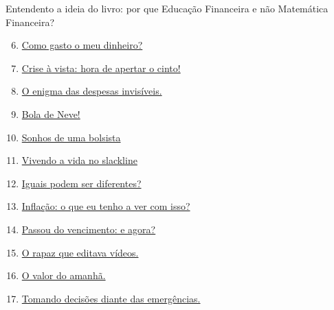 \begin{apresentacao}{Entendento a ideia do livro: por que Educação Financeira e não Matemática Financeira?}
\begin{multicols}{2}
\begin{enumerate}[label=Atividade \arabic* --, wide]\setcounter{enumi}{5}
\item \hyperref[fin-ativ-6]{Como gasto o meu dinheiro?}
\item \hyperref[fin-ativ-7]{Crise à vista: hora de apertar o cinto!}
\end{enumerate}

\begin{enumerate}[label=Atividade \arabic* --, wide]\setcounter{enumi}{7}
\item \hyperref[fin-ativ-8]{O enigma das despesas invisíveis.}
\item \hyperref[fin-ativ-9]{Bola de Neve!}
\end{enumerate}

\begin{enumerate}[label=Atividade \arabic* --, wide]\setcounter{enumi}{9}
\item \hyperref[fin-ativ-10]{Sonhos de uma bolsista}
\item \hyperref[fin-ativ-11]{Vivendo a vida no slackline}
\end{enumerate}
\vspace{1em}
\columnbreak

\begin{enumerate}[label=Atividade \arabic* --, wide]\setcounter{enumi}{11}
\item \hyperref[fin-ativ-12]{Iguais podem ser diferentes?}
\item \hyperref[fin-ativ-13]{Inflação: o que eu tenho a ver com isso?}
\item \hyperref[fin-ativ-14]{Passou do vencimento: e agora?}
\end{enumerate}


\begin{enumerate}[label=Atividade \arabic* --, wide]\setcounter{enumi}{14}
\item \hyperref[fin-ativ-15]{O rapaz que editava vídeos.}
\item \hyperref[fin-ativ-16]{O valor do amanhã.}
\item \hyperref[fin-ativ-17]{Tomando decisões diante das emergências.}
\end{enumerate}
\vspace{1em}


\end{multicols}
\end{apresentacao}
